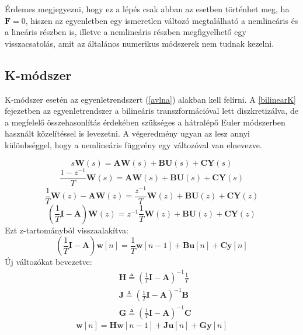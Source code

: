 Érdemes megjegyezni, hogy ez a lépés csak abban az esetben történhet meg, ha $\mathbf{F}=0$, hiszen az egyenletben egy ismeretlen változó megtalálható a nemlineáris és a lineáris részben is, illetve a nemlineáris részben megfigyelhető egy visszacsatolás, amit az általános numerikus módszerek nem tudnak kezelni. 




\subsection{K-módszer}
K-módszer esetén az egyenletrendszert (\ref{avlna}) alakban kell felírni. A \ref{bilinearK} fejezetben az egyenletrendszer a bilineáris transzformációval lett diszkretizálva, de a megfelelő összehasonlítás érdekében szükséges a hátralépő Euler módszerben használt közelítéssel is levezetni. A végeredmény ugyan az lesz annyi különbséggel, hogy a nemlineáris függvény egy változóval van elnevezve.

\begin{equation}
    s\mathbf{W}(s)=\mathbf{AW}(s)+\mathbf{BU}(s)+\mathbf{CY}(s)
\end{equation}
\begin{equation}
    \frac{1-z^{-1}}{T}\mathbf{W}(s)=\mathbf{AW}(s)+\mathbf{BU}(s)+\mathbf{CY}(s)
\end{equation}
\begin{equation}
    \frac{1}{T}\mathbf{W}(z)-\mathbf{AW}(z)=\frac{z^{-1}}{T}\mathbf{W}(z)+\mathbf{BU}(z)+\mathbf{CY}(z)
\end{equation}
\begin{equation}
    (\frac{1}{T}\mathbf{I}-\mathbf{A})\mathbf{W}(z)=z^{-1}\frac{1}{T}\mathbf{W}(z)+\mathbf{BU}(z)+\mathbf{CY}(z)
\end{equation}
Ezt z-tartományból visszaalakítva:
\begin{equation}
    (\frac{1}{T}\mathbf{I}-\mathbf{A})\mathbf{w}[n]=\frac{1}{T}\mathbf{w}[n-1]+\mathbf{Bu}[n]+\mathbf{Cy}[n]
\end{equation}
Új változókat bevezetve:
\begin{eqnarray}
    &\mathbf{H}\triangleq (\frac{1}{T}\mathbf{I}-\mathbf{A})^{-1}\frac{1}{T}\\
    &\mathbf{J}\triangleq (\frac{1}{T}\mathbf{I}-\mathbf{A})^{-1}\mathbf{B}\\
    &\mathbf{G}\triangleq (\frac{1}{T}\mathbf{I}-\mathbf{A})^{-1}\mathbf{C}
\end{eqnarray}
\begin{equation}
    \mathbf{w}[n]=\mathbf{Hw}[n-1]+\mathbf{Ju}[n]+\mathbf{Gy}[n]
\end{equation}